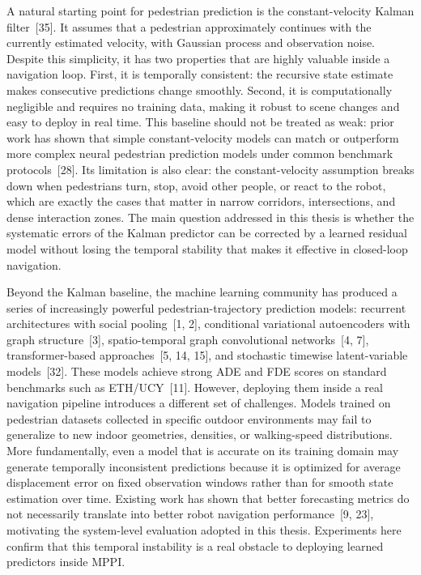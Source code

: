 \documentclass[12pt, a4paper]{article}
\begin{document}
A natural starting point for pedestrian prediction is the constant-velocity Kalman filter~[35]. It assumes that a pedestrian approximately continues with the currently estimated velocity, with Gaussian process and observation noise. Despite this simplicity, it has two properties that are highly valuable inside a navigation loop. First, it is temporally consistent: the recursive state estimate makes consecutive predictions change smoothly. Second, it is computationally negligible and requires no training data, making it robust to scene changes and easy to deploy in real time. This baseline should not be treated as weak: prior work has shown that simple constant-velocity models can match or outperform more complex neural pedestrian prediction models under common benchmark protocols~[28]. Its limitation is also clear: the constant-velocity assumption breaks down when pedestrians turn, stop, avoid other people, or react to the robot, which are exactly the cases that matter in narrow corridors, intersections, and dense interaction zones. The main question addressed in this thesis is whether the systematic errors of the Kalman predictor can be corrected by a learned residual model without losing the temporal stability that makes it effective in closed-loop navigation.

Beyond the Kalman baseline, the machine learning community has produced a series of increasingly powerful pedestrian-trajectory prediction models: recurrent architectures with social pooling~[1, 2], conditional variational autoencoders with graph structure~[3], spatio-temporal graph convolutional networks~[4, 7], transformer-based approaches~[5, 14, 15], and stochastic timewise latent-variable models~[32]. These models achieve strong ADE and FDE scores on standard benchmarks such as ETH/UCY~[11]. However, deploying them inside a real navigation pipeline introduces a different set of challenges. Models trained on pedestrian datasets collected in specific outdoor environments may fail to generalize to new indoor geometries, densities, or walking-speed distributions. More fundamentally, even a model that is accurate on its training domain may generate temporally inconsistent predictions because it is optimized for average displacement error on fixed observation windows rather than for smooth state estimation over time. Existing work has shown that better forecasting metrics do not necessarily translate into better robot navigation performance~[9, 23], motivating the system-level evaluation adopted in this thesis. Experiments here confirm that this temporal instability is a real obstacle to deploying learned predictors inside MPPI.
\end{document}

